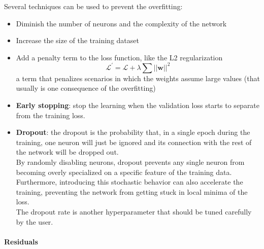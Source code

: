Several techniques can be used to prevent the overfitting:
\begin{itemize}
    \item Diminish the number of neurons and the complexity of the network
    \item Increase the size of the training dataset
    \item Add a penalty term to the loss function, like the L2 regularization
    \begin{equation}
        \mathcal{L}^{'}=\mathcal{L}+\lambda \sum ||\bm{w}||^2
    \end{equation}
    a term that penalizes scenarios in which the weights assume large values (that usually is one consequence of the overfitting)
    \item \textbf{Early stopping}: stop the learning when the validation loss starts to separate from the training loss.
    \item \textbf{Dropout}: the dropout \cite{Srivastava2014Dropout:Overfitting} is the probability that, in a single epoch during the training, one neuron will just be ignored and its connection with the rest of the network will be dropped out. \\
    By randomly disabling neurons, dropout prevents any single neuron from becoming overly specialized on a specific feature of the training data.\\
    Furthermore, introducing this stochastic behavior can also accelerate the training, preventing the network from getting stuck in local minima of the loss.\\
    The dropout rate is another hyperparameter that should be tuned carefully by the user.
\end{itemize}

\paragraph*{Residuals}\hspace{1cm}\\

